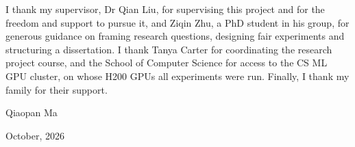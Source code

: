 \documentclass[a4paper,12pt,numbered,oneside,openany]{uathesis}
\begin{document}
\begin{acknowledgements}
I thank my supervisor, Dr Qian Liu, for supervising this project and for the freedom and support to pursue it, and Ziqin Zhu, a PhD student in his group, for generous guidance on framing research questions, designing fair experiments and structuring a dissertation. I thank Tanya Carter for coordinating the research project course, and the School of Computer Science for access to the CS ML GPU cluster, on whose H200 GPUs all experiments were run. Finally, I thank my family for their support.

\begin{flushright}
Qiaopan Ma

October, 2026
\end{flushright}
\end{acknowledgements}

\setcounter{tocdepth}{1}
\tableofcontents
{}
\listoffigures
{}
\listoftables
{}
\printglossary[type=\acronymtype, style=mcolindex, nonumberlist]

\mainmatter








\backmatter


\end{document}

